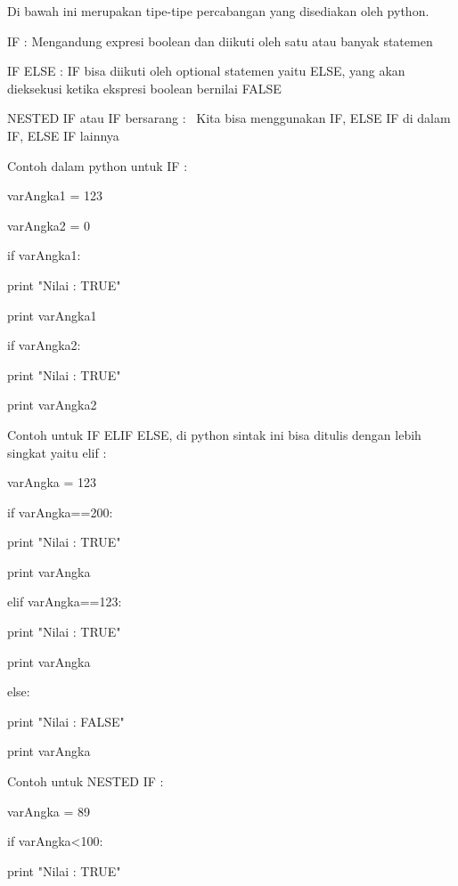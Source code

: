  
Di bawah ini merupakan tipe-tipe percabangan yang disediakan oleh python. 

 
IF : Mengandung expresi boolean dan diikuti oleh satu atau banyak statemen 

 
IF ELSE : IF bisa diikuti oleh optional statemen yaitu ELSE, yang akan dieksekusi ketika ekspresi boolean bernilai FALSE 

 
NESTED IF atau IF bersarang :~ Kita bisa menggunakan IF, ELSE IF di dalam IF, ELSE IF lainnya 

 
Contoh dalam python untuk IF :  

 
varAngka1 = 123 

 
varAngka2 = 0 

 
if varAngka1: 

 
                                                print "Nilai : TRUE" 

 
                                                print varAngka1 

 
if varAngka2: 

 
                                                print "Nilai : TRUE" 

 
                                                print varAngka2{\fontsize{14pt}{14pt}\selectfont     \\} 

 
Contoh untuk IF ELIF ELSE, di python sintak ini bisa ditulis dengan lebih singkat yaitu elif :  

 
varAngka = 123 
 
    
 
if varAngka==200: 

 
                           print "Nilai : TRUE" 

 
                           print varAngka 

 
elif varAngka==123: 

 
                           print "Nilai : TRUE" 

 
                           print varAngka 

 
else: 

 
                           print "Nilai : FALSE" 

 
                           print varAngka 

 
Contoh untuk NESTED IF :  

 
varAngka = 89 
 
    
 
if varAngka<100: 

 
                       print "Nilai : TRUE" 

